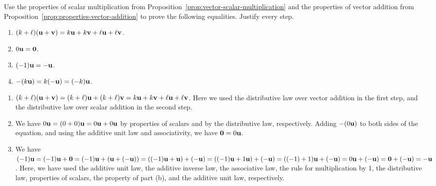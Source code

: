 \begin{ex}
  Use the properties of scalar multiplication from
  Proposition~\ref{prop:vector-scalar-multiplication} and the
  properties of vector addition from
  Proposition~\ref{prop:properties-vector-addition} to prove the
  following equalities. Justify every step.
  \begin{enumerate}
  \item $(k+\ell)(\vect{u}+\vect{v}) = k\vect{u} + k\vect{v} +
    \ell\vect{u} + \ell\vect{v}$.
  \item $0\vect{u} = \vect{0}$.
  \item $(-1)\vect{u} = -\vect{u}$.
  \item $-(k\vect{u}) = k(-\vect{u}) = (-k)\vect{u}$.
  \end{enumerate}
  \begin{sol}
    \begin{enumerate}
    \item
      $(k+\ell)(\vect{u}+\vect{v}) = (k+\ell)\vect{u} +
      (k+\ell)\vect{v} = k\vect{u} + k\vect{v} + \ell\vect{u} +
      \ell\vect{v}$. Here we used the distributive law over vector
      addition in the first step, and the distributive law over scalar
      addition in the second step.
    \item We have $0\vect{u} = (0+0)\vect{u} = 0\vect{u} + 0\vect{u}$
      by properties of scalars and by the distributive law,
      respectively. Adding $-(0\vect{u})$ to both sides of the
      equation, and using the additive unit law and associativity, we
      have $\vect{0} = 0\vect{u}$.
    \item We have $(-1)\vect{u} = (-1)\vect{u} + \vect{0} =
      (-1)\vect{u} + (\vect{u} + (-\vect{u})) = ((-1)\vect{u} +
      \vect{u}) + (-\vect{u}) = ((-1)\vect{u} + 1\vect{u}) +
      (-\vect{u}) = ((-1)+1)\vect{u} + (-\vect{u}) = 0\vect{u} +
      (-\vect{u}) = \vect{0} + (-\vect{u}) = -\vect{u}$. Here, we have
      used the additive unit law, the additive inverse law, the
      associative law, the rule for multiplication by 1, the
      distributive law, properties of scalars, the property of part
      (b), and the additive unit law, respectively.
    \end{enumerate}
  \end{sol}
\end{ex}

